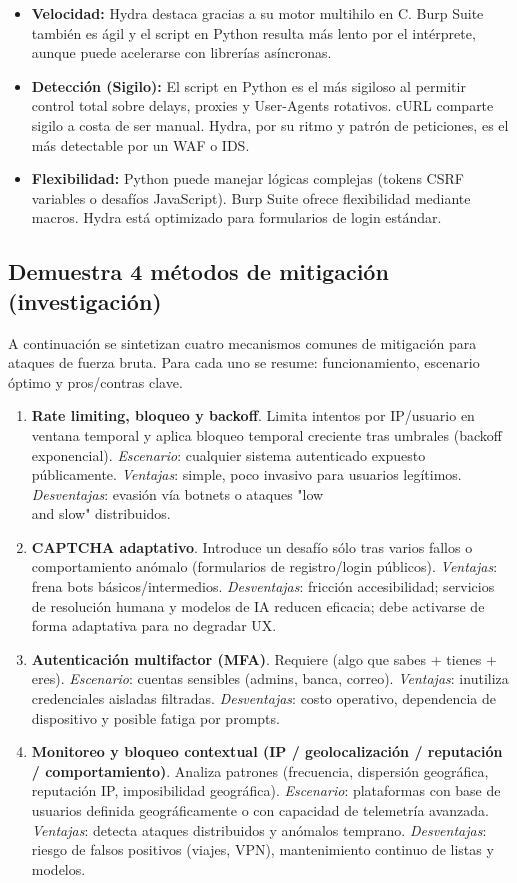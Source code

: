 \documentclass[letterpaper,12pt]{article}
\let\origsubsection\subsection
\renewcommand{\subsection}{\FloatBarrier\origsubsection}
\begin{document}
\begin{itemize}
    \item \textbf{Velocidad:} Hydra destaca gracias a su motor multihilo en C. Burp Suite también es ágil y el script en Python resulta más lento por el intérprete, aunque puede acelerarse con librerías asíncronas.
    \item \textbf{Detección (Sigilo):} El script en Python es el más sigiloso al permitir control total sobre delays, proxies y User-Agents rotativos. cURL comparte sigilo a costa de ser manual. Hydra, por su ritmo y patrón de peticiones, es el más detectable por un WAF o IDS.
    \item \textbf{Flexibilidad:} Python puede manejar lógicas complejas (tokens CSRF variables o desafíos JavaScript). Burp Suite ofrece flexibilidad mediante macros. Hydra está optimizado para formularios de login estándar.
\end{itemize}

\newpage
\subsection{Demuestra 4 métodos de mitigación (investigación)}
\noindent A continuación se sintetizan cuatro mecanismos comunes de mitigación para ataques de fuerza bruta. Para cada uno se resume: funcionamiento, escenario óptimo y pros/contras clave.
\begin{enumerate}
  \item \textbf{Rate limiting, bloqueo y backoff}. Limita intentos por IP/usuario en ventana temporal y aplica bloqueo temporal creciente tras umbrales (backoff exponencial). \emph{Escenario}: cualquier sistema autenticado expuesto públicamente. \emph{Ventajas}: simple, poco invasivo para usuarios legítimos. \emph{Desventajas}: evasión vía botnets o ataques "low \\
  and slow" distribuidos.
  \item \textbf{CAPTCHA adaptativo}. Introduce un desafío sólo tras varios fallos o comportamiento anómalo (formularios de registro/login públicos). \emph{Ventajas}: frena bots básicos/intermedios. \emph{Desventajas}: fricción accesibilidad; servicios de resolución humana y modelos de IA reducen eficacia; debe activarse de forma adaptativa para no degradar UX.
  \item \textbf{Autenticación multifactor (MFA)}. Requiere (algo que sabes + tienes + eres). \emph{Escenario}: cuentas sensibles (admins, banca, correo). \emph{Ventajas}: inutiliza credenciales aisladas filtradas. \emph{Desventajas}: costo operativo, dependencia de dispositivo y posible fatiga por prompts.
  \item \textbf{Monitoreo y bloqueo contextual (IP / geolocalización / reputación / comportamiento)}. Analiza patrones (frecuencia, dispersión geográfica, reputación IP, imposibilidad geográfica). \emph{Escenario}: plataformas con base de usuarios definida geográficamente o con capacidad de telemetría avanzada. \emph{Ventajas}: detecta ataques distribuidos y anómalos temprano. \emph{Desventajas}: riesgo de falsos positivos (viajes, VPN), mantenimiento continuo de listas y modelos.
\end{enumerate}
\end{document}
